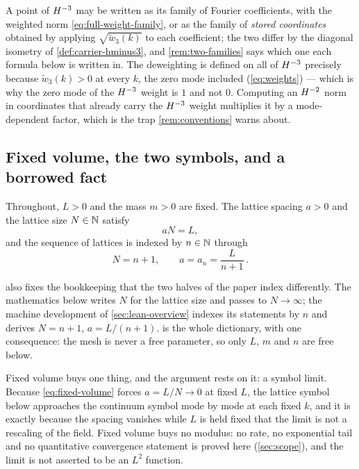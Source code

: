 A point of $H^{-3}$ may be written as its family of Fourier coefficients, with
the weighted norm \eqref{eq:full-weight-family}, or as the family of
\emph{stored coordinates} obtained by applying $\sqrt{\widetilde w_3(k)}$ to
each coefficient; the two differ by the diagonal isometry of
\cref{def:carrier-hminus3}, and \cref{rem:two-families} says which one each
formula below is written in. The deweighting is defined on all of $H^{-3}$
precisely because $\widetilde w_3(k)>0$ at every $k$, the zero mode included
(\cref{eq:weights}) --- which is why the zero mode of the $H^{-3}$ weight is $1$
and not $0$. Computing an $H^{-2}$ norm in coordinates that already carry the
$H^{-3}$ weight multiplies it by a mode-dependent factor, which is the trap
\cref{rem:conventions} warns about.

\subsection{Fixed volume, the two symbols, and a borrowed fact}

\begin{hypothesis}\label{hyp:volume}
Throughout, $L>0$ and the mass $m>0$ are fixed. The lattice spacing $a>0$ and
the lattice size $N\in\mathbb{N}$ satisfy
\begin{equation}\label{eq:fixed-volume}
  aN=L,
\end{equation}
and the sequence of lattices is indexed by $n\in\mathbb{N}$ through
\begin{equation}\label{eq:index-dictionary}
  N=n+1,\qquad a=a_n=\frac{L}{n+1}\ .
\end{equation}
\end{hypothesis}

 also fixes the bookkeeping that the two halves of the paper
index differently. The mathematics below writes $N$ for the lattice size and
passes to $N\to\infty$; the machine development of \cref{sec:lean-overview}
indexes its statements by $n$ and derives $N=n+1$, $a=L/(n+1)$.
 is the whole dictionary, with one consequence: the
mesh is never a free parameter, so only $L$, $m$ and $n$ are free below.

Fixed volume buys one thing, and the argument rests on it: a symbol limit.
Because \eqref{eq:fixed-volume} forces $a=L/N\to0$ at fixed $L$, the lattice
symbol below approaches the continuum symbol mode by mode at each fixed $k$, and
it is exactly because the spacing vanishes while $L$ is held fixed that the limit
is not a rescaling of the field. Fixed volume buys no modulus: no rate, no
exponential tail and no quantitative convergence statement is proved here
(\cref{sec:scope}), and the limit is not asserted to be an $L^2$ function.

